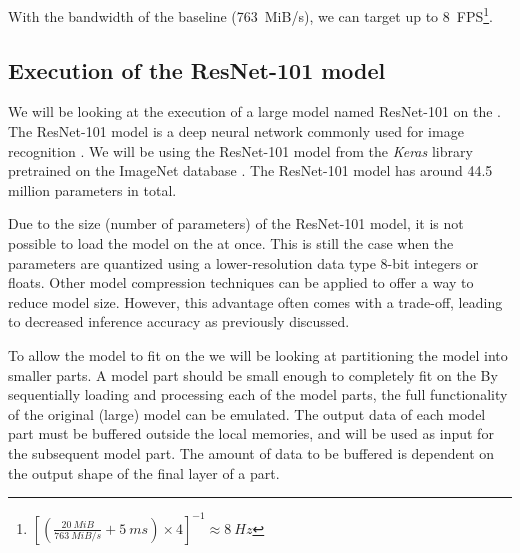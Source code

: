 With the bandwidth of the baseline \confignoc{} (\SI{763}{MiB/s}), we can target up to \SI{8}{FPS}\footnote{$\left[ \left( \frac{\SI{20}{MiB}}{\SI{763}{MiB/s}} + \SI{5}{ms} \right) \times 4 \right]^{-1} \approx \SI{8}{Hz}$}.

\subsection{Execution of the ResNet-101 model}
We will be looking at the execution of a large model named ResNet-101 on the \graicore{}.
The ResNet-101 model is a deep neural network commonly used for image recognition \autocite{heDeepResidualLearning2015}.
We will be using the ResNet-101 model from the \textit{Keras} library \cite{chollet2015keras} pretrained on the ImageNet database \cite{russakovskyImageNetLargeScale2014}.
The ResNet-101 model has around 44.5 million parameters in total.

Due to the size (number of parameters) of the ResNet-101 model, it is not possible to load the model on the \graicore{} at once.
This is still the case when the parameters are quantized using a lower-resolution data type 8-bit integers or floats.
Other model compression techniques can be applied to offer a way to reduce model size.
However, this advantage often comes with a trade-off, leading to decreased inference accuracy as previously discussed.


To allow the model to fit on the \graicore{} we will be looking at partitioning the model into smaller parts.
A model part should be small enough to completely fit on the \graicore{}
By sequentially loading and processing each of the model parts, the full functionality of the original (large) model can be emulated.
The output data of each model part must be buffered outside the local memories, and will be used as input for the subsequent model part.
The amount of data to be buffered is dependent on the output shape of the final layer of a part.


